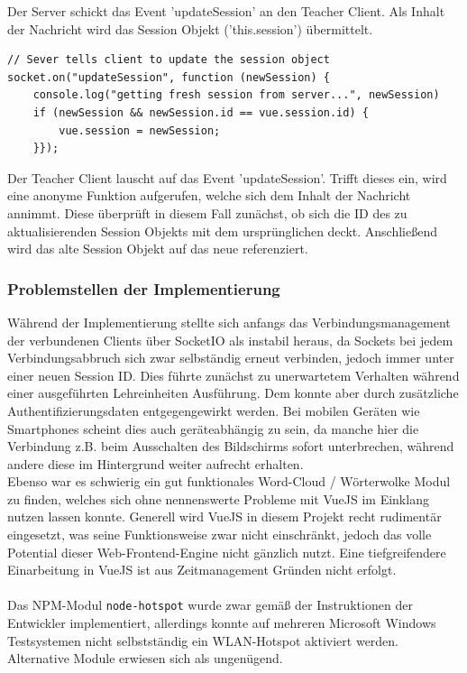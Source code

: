 \footnotesize
Der Server schickt das Event 'updateSession' an den Teacher Client.
Als Inhalt der Nachricht wird das Session Objekt ('this.session') übermittelt.
\begin{lstlisting}[caption=Client Socket Event Listener]
// Sever tells client to update the session object
socket.on("updateSession", function (newSession) {
	console.log("getting fresh session from server...", newSession)
	if (newSession && newSession.id == vue.session.id) {
		vue.session = newSession;
	}});
\end{lstlisting}
\footnotesize
Der Teacher Client lauscht auf das Event 'updateSession'. Trifft dieses ein,
wird eine anonyme Funktion aufgerufen, welche sich dem Inhalt der Nachricht annimmt.
Diese überprüft in diesem Fall zunächst, ob sich die ID des zu aktualisierenden Session Objekts
mit dem ursprünglichen deckt. Anschließend wird das alte Session Objekt auf das neue referenziert. 

\normalsize 
 
\subsubsection{Problemstellen der Implementierung}\label{sec:probsserver}
Während der Implementierung stellte sich anfangs das Verbindungsmanagement der verbundenen Clients über SocketIO als instabil heraus, da Sockets bei jedem Verbindungsabbruch sich zwar selbständig erneut verbinden, jedoch immer unter einer neuen Session ID. Dies führte zunächst zu unerwartetem Verhalten während einer ausgeführten Lehreinheiten Ausführung. Dem konnte aber durch zusätzliche Authentifizierungsdaten entgegengewirkt werden. Bei mobilen Geräten wie Smartphones scheint dies auch geräteabhängig zu sein, da manche hier die Verbindung z.B. beim Ausschalten des Bildschirms sofort unterbrechen, während andere diese im Hintergrund weiter aufrecht erhalten. \\ Ebenso war es schwierig ein gut funktionales Word-Cloud / Wörterwolke Modul zu finden, welches sich ohne nennenswerte Probleme mit VueJS im Einklang nutzen lassen konnte. Generell wird VueJS in diesem Projekt recht rudimentär eingesetzt, was seine Funktionsweise zwar nicht einschränkt, jedoch das volle Potential dieser Web-Frontend-Engine nicht gänzlich nutzt. Eine tiefgreifendere Einarbeitung in VueJS ist aus Zeitmanagement Gründen nicht erfolgt. \\ \\ Das NPM-Modul \texttt{node-hotspot} wurde zwar gemäß der Instruktionen der Entwickler implementiert, allerdings konnte auf mehreren Microsoft Windows Testsystemen nicht selbstständig ein WLAN-Hotspot aktiviert werden. Alternative Module erwiesen sich als ungenügend. 
 
 
 
